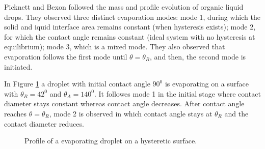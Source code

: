 \documentclass{article}
\begin{document}
\par
Picknett and Bexon\cite{PICKNETT1977336} followed the mass and profile evolution of organic liquid drops. They observed three
distinct evaporation modes: mode 1, during which the
solid and iquid interface area remains constant (when hysteresis
exists); mode 2, for which the contact angle remains
constant (ideal system with no hysteresis at equilibrium);
mode 3, which is a mixed mode. They also observed that evaporation follows the first mode until $\theta = \theta_{R}$, and then, the second mode is initiated.\cite{doi:10.1021/la00007a076}


\par
In Figure \ref*{fig:evpn_cah} a droplet with initial contact angle $90^{0}$ is evaporating on a surface with $\theta_{R} = 42^{0}$ and $\theta_{A} = 140^{0}$. It followes mode 1 in the initial stage where contact diameter stays constant whereas contact angle decreases. After contact angle reaches $\theta = \theta_{R}$, mode 2 is observed in which contact angle stays at $\theta_{R}$ and the contact diameter reduces. 
\begin{figure}[h!]
	\begin{center}
		\caption{Profile of a evaporating droplet on a hysteretic surface. }
		\label{fig:evpn_cah}
	\end{center}
	
\end{figure}
\end{document}
